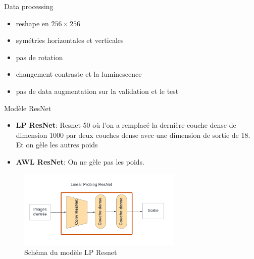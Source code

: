 \documentclass[11pt]{beamer}
\begin{document}
\begin{frame}{Data processing}
    \begin{itemize}
        \item reshape en $256\times256$
        \item symétries horizontales et verticales
        \item pas de rotation
        \item changement contraste et la luminescence
        \item pas de data augmentation sur la validation et le test
    \end{itemize}
\end{frame}

\begin{frame}{Modèle ResNet}
    \begin{itemize}
        \item \textbf{LP ResNet}: Resnet 50 où l'on a remplacé la dernière couche dense de dimension 1000 par deux couches dense avec une dimension de sortie de 18. Et on gèle les autres poids
        \item \textbf{AWL ResNet}: On ne gèle pas les poids.
    \end{itemize}
    \begin{figure}
        \centering
        \includegraphics[width=0.7\textwidth]{../asset/Resnet.png}
        \caption{Schéma du modèle LP Resnet}
        \label{fig:resnet}
    \end{figure}
\end{frame}
\end{document}
